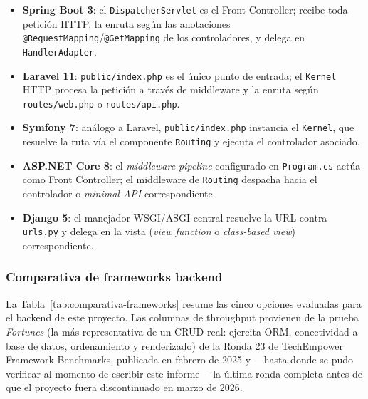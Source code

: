 \documentclass[12pt,a4paper]{article}
\begin{document}
\begin{itemize}
  \item \textbf{Spring Boot 3}: el \texttt{DispatcherServlet} es el Front
    Controller; recibe toda petición HTTP, la enruta según las anotaciones
    \texttt{@RequestMapping}/\texttt{@GetMapping} de los controladores, y
    delega en \texttt{HandlerAdapter}.
  \item \textbf{Laravel 11}: \texttt{public/index.php} es el único punto
    de entrada; el \texttt{Kernel} HTTP procesa la petición a través de
    middleware y la enruta según \texttt{routes/web.php} o
    \texttt{routes/api.php}.
  \item \textbf{Symfony 7}: análogo a Laravel, \texttt{public/index.php}
    instancia el \texttt{Kernel}, que resuelve la ruta vía el componente
    \texttt{Routing} y ejecuta el controlador asociado.
  \item \textbf{ASP.NET Core 8}: el \emph{middleware pipeline} configurado
    en \texttt{Program.cs} actúa como Front Controller; el middleware de
    \texttt{Routing} despacha hacia el controlador o \emph{minimal API}
    correspondiente.
  \item \textbf{Django 5}: el manejador WSGI/ASGI central resuelve la URL
    contra \texttt{urls.py} y delega en la vista (\emph{view function} o
    \emph{class-based view}) correspondiente.
\end{itemize}

\subsubsection{Comparativa de frameworks backend}

La Tabla~\ref{tab:comparativa-frameworks} resume las cinco opciones
evaluadas para el backend de este proyecto. Las columnas de throughput
provienen de la prueba \emph{Fortunes} (la más representativa de un CRUD
real: ejercita ORM, conectividad a base de datos, ordenamiento y
renderizado) de la Ronda 23 de TechEmpower Framework Benchmarks, publicada
en febrero de 2025 y —hasta donde se pudo verificar al momento de escribir
este informe— la última ronda completa antes de que el proyecto fuera
discontinuado en marzo de 2026.
\end{document}
